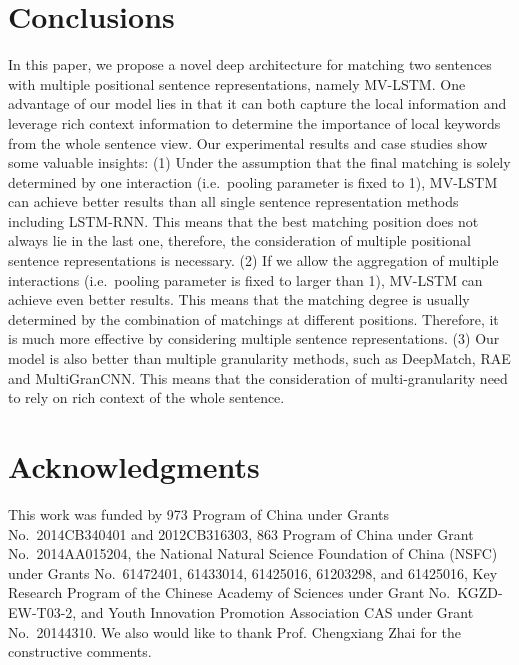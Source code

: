 \documentclass[letterpaper]{article}
\begin{document}
\section{Conclusions}
In this paper, we propose a novel deep architecture for matching two sentences with multiple positional sentence representations, namely MV-LSTM. One advantage of our model lies in that it can both capture the local information and leverage rich context information to determine the importance of local keywords from the whole sentence view. Our experimental results and case studies show some valuable insights: (1) Under the assumption that the final matching is solely determined by one interaction (i.e.~pooling parameter is fixed to 1), MV-LSTM can achieve better results than all single sentence representation methods including LSTM-RNN. This means that the best matching position does not always lie in the last one, therefore, the consideration of multiple positional sentence representations is necessary. (2) If we allow the aggregation of multiple interactions (i.e.~pooling parameter is fixed to larger than 1), MV-LSTM can achieve even better results. This means that the matching degree is usually determined by the combination of matchings at different positions. Therefore, it is much more effective by considering multiple sentence representations. (3) Our model is also better than multiple granularity methods, such as DeepMatch, RAE and MultiGranCNN. This means that the consideration of multi-granularity need to rely on rich context of the whole sentence.

\newpage
\section{Acknowledgments}
This work was funded by 973 Program of China under Grants No.~2014CB340401 and 2012CB316303, 863 Program of China under Grant No.~2014AA015204, the National Natural Science Foundation of China (NSFC) under Grants No.~61472401, 61433014, 61425016, 61203298, and 61425016, Key Research Program of the Chinese Academy of Sciences under Grant No.~KGZD-EW-T03-2, and Youth Innovation Promotion Association CAS under Grant No.~20144310.
We also would like to thank Prof. Chengxiang Zhai for the constructive comments.  


\end{document}
